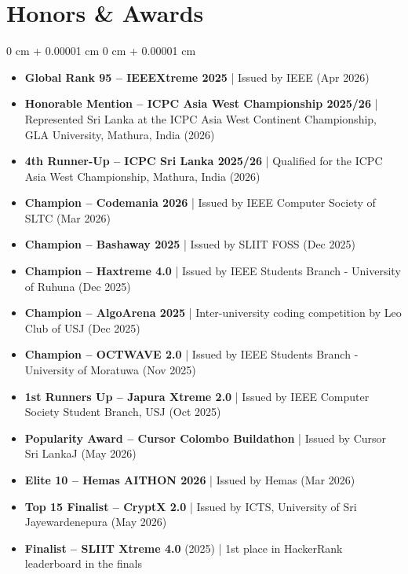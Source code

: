 \documentclass[10pt, letterpaper]{article}
\newenvironment{highlights}{ \begin{itemize}[ topsep=0.10 cm, parsep=0.10 cm, partopsep=0pt,
itemsep=0pt, leftmargin=0 cm + 10pt ] }{ \end{itemize} } %
\newenvironment{onecolentry}{ \begin{adjustwidth}{ 0 cm + 0.00001 cm }{ 0 cm + 0.00001 cm }
}{ \end{adjustwidth} } %
\begin{document}
  \section{Honors \& Awards}
  \begin{onecolentry}
    \begin{highlights}
    \item \textbf{Global Rank 95 -- IEEEXtreme 2025} | Issued by IEEE (Apr 2026)
    \item \textbf{Honorable Mention -- ICPC Asia West Championship 2025/26} | Represented Sri Lanka at the ICPC Asia West Continent Championship, GLA University, Mathura, India (2026)
      \item \textbf{4th Runner-Up -- ICPC Sri Lanka 2025/26} | Qualified for the ICPC Asia West Championship, Mathura, India (2026)
      \item \textbf{Champion -- Codemania 2026} | Issued by IEEE Computer Society of SLTC (Mar 2026)
      \item \textbf{Champion -- Bashaway 2025} | Issued by SLIIT FOSS (Dec 2025)
      \item \textbf{Champion -- Haxtreme 4.0} | Issued by IEEE Students Branch - University
      of Ruhuna (Dec 2025) \item \textbf{Champion -- AlgoArena 2025} | Inter-university
      coding competition by Leo Club of USJ (Dec 2025) \item \textbf{Champion -- OCTWAVE
      2.0} | Issued by IEEE Students Branch - University of Moratuwa (Nov 2025)
      \item \textbf{1st Runners Up -- Japura Xtreme 2.0} | Issued by IEEE Computer
      Society Student Branch, USJ (Oct 2025)
    \item  \textbf{Popularity Award -- Cursor Colombo Buildathon} | Issued by Cursor Sri LankaJ (May 2026)
     \item \textbf{Elite 10 -- Hemas AITHON 2026} | Issued by Hemas (Mar 2026)
    \item  \textbf{Top 15 Finalist -- CryptX 2.0} | Issued by ICTS, University of Sri Jayewardenepura (May 2026)
    \item \textbf{Finalist -- SLIIT Xtreme 4.0} (2025) | 1st place in HackerRank leaderboard in the finals
    \end{highlights}
  \end{onecolentry}
\end{document}
